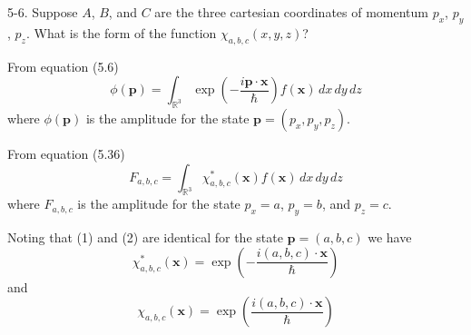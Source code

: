 \documentclass[12pt]{article}
\newcommand\INT{\int_{\mathbb R^3}}
\begin{document}
5-6.
Suppose $A$, $B$, and $C$ are the three cartesian coordinates
of momentum $p_x$, $p_y$, $p_z$.
What is the form of the function $\chi_{a,b,c}(x,y,z)$?

\bigskip
From equation (5.6)
\begin{equation*}
\phi(\mathbf p)=\INT\exp\left(-\frac{i\mathbf p\cdot\mathbf x}{\hbar}\right)f(\mathbf x)\,dx\,dy\,dz
\tag{1}
\end{equation*}
where $\phi(\mathbf p)$ is the amplitude for the state $\mathbf p=(p_x,p_y,p_z)$.

\bigskip
From equation (5.36)
\begin{equation*}
F_{a,b,c}=\INT\chi_{a,b,c}^*(\mathbf x)f(\mathbf x)\,dx\,dy\,dz
\tag{2}
\end{equation*}
where $F_{a,b,c}$ is the amplitude for the state $p_x=a$, $p_y=b$, and $p_z=c$.

\bigskip
Noting that (1) and (2) are identical for the state $\mathbf p=(a,b,c)$ we have
\begin{equation*}
\chi_{a,b,c}^*(\mathbf x)=\exp\left(-\frac{i(a,b,c)\cdot\mathbf x}{\hbar}\right)
\end{equation*}
and
\begin{equation*}
\chi_{a,b,c}(\mathbf x)=\exp\left(\frac{i(a,b,c)\cdot\mathbf x}{\hbar}\right)
\end{equation*}
\end{document}
